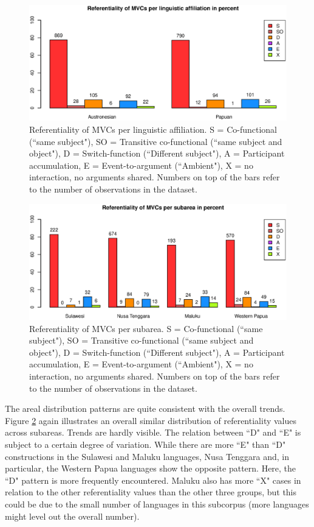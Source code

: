 \begin{figure}
\includegraphics[width=\columnwidth]{figures/Referentiality_Family.eps}
\caption[Referentiality of MVCs per linguistic affiliation]{Referentiality of MVCs per linguistic affiliation. S = Co-functional (``same subject"), SO = Transitive co-functional (``same subject and object"), D = Switch-function (``Different subject"), A = Participant accumulation, E = Event-to-argument (``Ambient"), X = no interaction, no arguments shared. Numbers on top of the bars refer to the number of observations in the dataset.}\label{fig:ref-family}
\end{figure}
\begin{figure}
\includegraphics[width=\columnwidth]{figures/Referentiality_Group.eps}
\caption[Referentiality of MVCs per subarea]{Referentiality of MVCs per subarea. S = Co-functional (``same subject"), SO = Transitive co-functional (``same subject and object"), D = Switch-function (``Different subject"), A = Participant accumulation, E = Event-to-argument (``Ambient"), X = no interaction, no arguments shared. Numbers on top of the bars refer to the number of observations in the dataset.}\label{fig:ref-group}
\end{figure}

The areal distribution patterns are quite consistent with the overall trends. Figure \ref{fig:ref-group} again illustrates an overall similar distribution of referentiality values across subareas. Trends are hardly visible. The relation between ``D" and ``E" is subject to a certain degree of variation. While there are more ``E" than ``D" constructions in the Sulawesi and Maluku languages, Nusa Tenggara and, in particular, the Western Papua languages show the opposite pattern. Here, the ``D" pattern is more frequently encountered. Maluku also has more ``X" cases in relation to the other referentiality values than the other three groups, but this could be due to the small number of languages in this subcorpus (more languages might level out the overall number).

